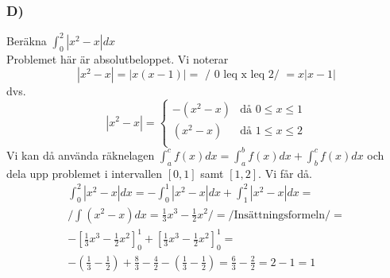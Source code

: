 \documentclass[12pt]{article}
\begin{document}
\subsubsection*{D)}
Beräkna $ \int_0^2 |x^2-x|dx$ \\
Problemet här är absolutbeloppet. Vi noterar \\
\[ |x^2-x|=|x(x-1)| = \mbox{ / 0 leq x leq 2/ } = x|x-1| \]
dvs.
\[
|x^2-x|=\begin{cases} 
	-(x^2-x) & \mbox{då } 0 \leq x \leq 1 \\
	 (x^2-x) & \mbox{då } 1 \leq x \leq 2 \\
\end{cases}
\]
Vi kan då använda räknelagen $ \int_a^cf(x)dx=\int_a^bf(x)dx + \int_b^cf(x)dx$
och dela upp  problemet i intervallen $[0,1]$ samt $[1,2]$. Vi får då.
\[
\begin{split}
\int_0^2 |x^2-x|dx = -\int_0^1|x^2-x|dx  + \int_1^2 |x^2-x|dx =\\
 /\int(x^2-x)dx = \frac{1}{3}x^3 - \frac{1}{2}x^2 /=/\mbox{Insättningsformeln}/=\\
 -\left[\frac{1}{3}x^3 - \frac{1}{2}x^2 \right]_0^1 +\left[\frac{1}{3}x^3 - \frac{1}{2}x^2 \right]_0^1 =\\
 -\left(\frac{1}{3}-\frac{1}{2}\right)+\frac{8}{3}-\frac{4}{2}-\left(\frac{1}{3}-\frac{1}{2}\right)=\frac{6}{3}-\frac{2}{2}= 2-1= 1
\end{split}
\]
\end{document}
